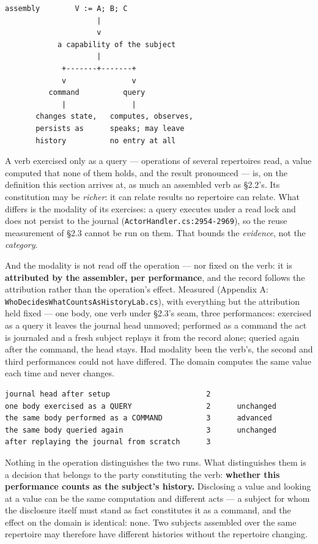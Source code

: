 \documentclass[
]{article}
\newcounter{none} %
\begin{document}
\begin{verbatim}
assembly        V := A; B; C
                     |
                     v
            a capability of the subject
                     |
             +-------+-------+
             v               v
          command          query
             |               |
       changes state,   computes, observes,
       persists as      speaks; may leave
       history          no entry at all
\end{verbatim}

A verb exercised only as a query --- operations of several repertoires
read, a value computed that none of them holds, and the result
pronounced --- is, on the definition this section arrives at, as much an
assembled verb as §2.2's. Its constitution may be \emph{richer}: it can
relate results no repertoire can relate. What differs is the modality of
its exercises: a query executes under a read lock and does not persist
to the journal (\texttt{ActorHandler.cs:2954-2969}), so the reuse
measurement of §2.3 cannot be run on them. That bounds the
\emph{evidence}, not the \emph{category}.

And the modality is not read off the operation --- nor fixed on the
verb: it is \textbf{attributed by the assembler, per performance}, and
the record follows the attribution rather than the operation's effect.
Measured (Appendix A: \texttt{WhoDecidesWhatCountsAsHistoryLab.cs}),
with everything but the attribution held fixed --- one body, one verb
under §2.3's seam, three performances: exercised as a query it leaves
the journal head unmoved; performed as a command the act is journaled
and a fresh subject replays it from the record alone; queried again
after the command, the head stays. Had modality been the verb's, the
second and third performances could not have differed. The domain
computes the same value each time and never changes.

\begin{verbatim}
journal head after setup                      2
one body exercised as a QUERY                 2      unchanged
the same body performed as a COMMAND          3      advanced
the same body queried again                   3      unchanged
after replaying the journal from scratch      3
\end{verbatim}

Nothing in the operation distinguishes the two runs. What distinguishes
them is a decision that belongs to the party constituting the verb:
\textbf{whether this performance counts as the subject's history.}
Disclosing a value and looking at a value can be the same computation
and different acts --- a subject for whom the disclosure itself must
stand as fact constitutes it as a command, and the effect on the domain
is identical: none. Two subjects assembled over the same repertoire may
therefore have different histories without the repertoire changing.
\end{document}
